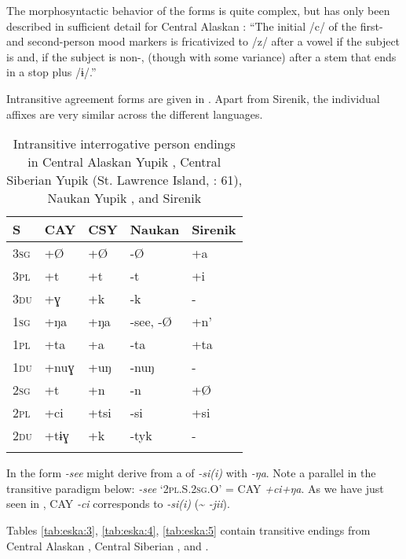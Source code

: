 The morphosyntactic behavior of the forms is quite complex, but has only been described in sufficient detail for Central Alaskan : “The initial /c/ of the first- and second-person mood markers is fricativized to /z/ after a vowel if the subject is  and, if the subject is non-, (though with some variance) after a stem that ends in a stop plus /ɨ/.” \citep[1352]{Miyaoka2012}

Intransitive  agreement forms are given in . Apart from Sirenik, the individual affixes are very similar across the different languages.

\begin{table}
\caption{Intransitive interrogative person endings in Central Alaskan Yupik \citep[1352]{Miyaoka2012}, Central Siberian Yupik (St. Lawrence Island, \citealt{Jacobson1979}: 61), Naukan Yupik \citep[240]{Menovshchikov1975}, and Sirenik \citep[521]{Vakhtin2000}}
\label{tab:eska:2}

\begin{tabularx}{\textwidth}{XXXXl}
\lsptoprule

S & \textbf{CAY} & \textbf{\textsc{CSY}} & \textbf{Naukan} & \textbf{Sirenik}\\
\midrule
\textsc{3sg} & +Ø & +Ø & -Ø & +a\\
\textsc{3pl} & +t & +t & -t & +i\\
\textsc{3du} & +ɣ & +k & -k & -\\
\textsc{1sg} & +ŋa & +ŋa & -see, -Ø & +n’\\
\textsc{1pl} & +ta & +a & -ta & +ta\\
\textsc{1du} & +nuɣ & +uŋ & -nuŋ & -\\
\textsc{2sg} & +t & +n & -n & +Ø\\
\textsc{2pl} & +ci & +tsi & -si & +si\\
\textsc{2du} & +tɨɣ & +k & -tyk & -\\
\lspbottomrule
\end{tabularx}
\end{table}

In   the form \textit{-see} might derive from a  of \textit{-si(i)} with \textit{-ŋa}. Note a parallel in the transitive paradigm below: \textit{-see} ‘\textsc{2pl.S.2sg.O}’ = CAY \textit{+ci+ŋa}. As we have just seen in , CAY \textit{-ci} corresponds to   \textit{-si(i)} ({\textasciitilde} \textit{-jii}).

Tables \ref{tab:eska:3}, \ref{tab:eska:4}, \ref{tab:eska:5} contain transitive  endings from Central Alaskan , Central Siberian , and  .

